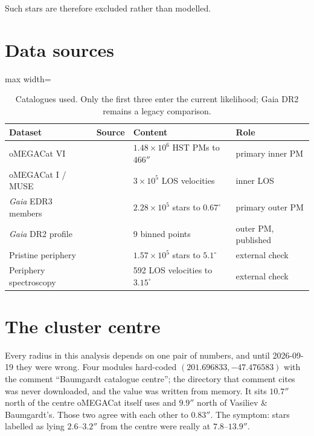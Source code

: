 \documentclass[11pt,a4paper]{article}
\begin{document}
Such stars are therefore excluded rather than modelled.

\section{Data sources}

\begin{table}[h]
\centering
\small
\begin{adjustbox}{max width=\linewidth}
\begin{tabular}{llll}
\toprule
Dataset & Source & Content & Role \\
\midrule
oMEGACat VI & \citet{haeberle2025} & $1.48\times10^6$ HST PMs to $466''$ & primary inner PM \\
oMEGACat I / MUSE & \citet{haeberle2025} & $3\times10^5$ LOS velocities & inner LOS \\
\emph{Gaia} EDR3 members & \citet{vasiliev2021} & $2.28\times10^5$ stars to $0.67^\circ$ & primary outer PM \\
\emph{Gaia} DR2 profile & \citet{baumgardt2019} & 9 binned points & outer PM, published \\
Pristine periphery & \citet{kuzma2025} & $1.57\times10^5$ stars to $5.1^\circ$ & external check \\
Periphery spectroscopy & \citet{kuzma2026} & 592 LOS velocities to $3.15^\circ$ & external check \\
\bottomrule
\end{tabular}
\end{adjustbox}
\caption{Catalogues used. Only the first three enter the current likelihood; Gaia DR2 remains a legacy comparison.}
\end{table}

\section{The cluster centre}

Every radius in this analysis depends on one pair of numbers, and until 2026-09-19 they were
wrong. Four modules hard-coded $(201.696833, -47.476583)$ with the comment ``Baumgardt
catalogue centre''; the directory that comment cites was never downloaded, and the value was
written from memory. It sits $10.7''$ north of the centre oMEGACat itself uses and $9.9''$
north of Vasiliev \& Baumgardt's. Those two agree with each other to $0.83''$. The symptom:
stars labelled as lying $2.6$--$3.2''$ from the centre were really at $7.8$--$13.9''$.
\end{document}
